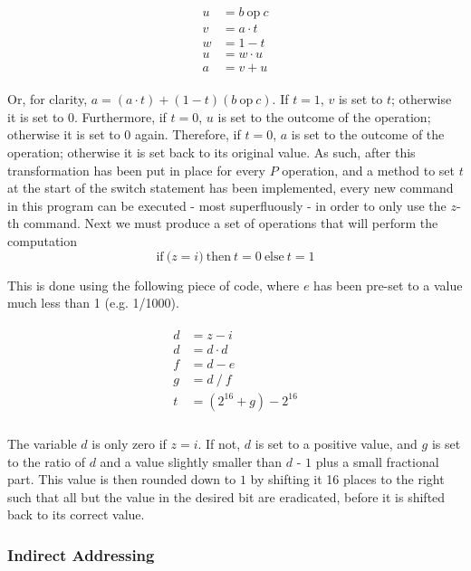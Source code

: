 \documentclass[Master.tex]{subfiles}
\begin{document}
\begin{gather*}
\begin{aligned}
u &= b\ \mathrm{op}\ c \\
v &= a \cdot t \\
w &= 1 - t \\
u &= w \cdot u \\
a &= v + u
\end{aligned}
\end{gather*}

Or, for clarity, $a = (a \cdot t) + (1 - t)(b\ \mathrm{op}\ c)$. If $t = 1$, $v$ is set to $t$; otherwise it is set to $0$. Furthermore, if $t = 0$, $u$ is set to the outcome of the operation; otherwise it is set to $0$ again. Therefore, if $t = 0$, $a$ is set to the outcome of the operation; otherwise it is set back to its original value. As such, after this transformation has been put in place for every $P$ operation, and a method to set $t$ at the start of the switch statement has been implemented, every new command in this program can be executed - most superfluously - in order to only use the $z$-th command. Next we must produce a set of operations that will perform the computation
\begin{equation*}
\mathrm{if\ (}z = i\mathrm{)\ then\ } t = 0 \mathrm{\ else\ } t = 1
\end{equation*}

This is done using the following piece of code, where $e$ has been pre-set to a value much less than 1 (e.g. 1/1000).

\begin{gather*}
\begin{aligned}
d &= z - i \\
d &= d \cdot d \\
f &= d - e \\
g &= d\ /\ f \\[1ex]
t &= (2^{16} + g) - 2^{16} \\
\end{aligned}
\end{gather*}

The variable $d$ is only zero if $z = i$. If not, $d$ is set to a positive value, and $g$ is set to the ratio of $d$ and a value slightly smaller than $d$ - $1$ plus a small fractional part. This value is then rounded down to $1$ by shifting it 16 places to the right such that all but the value in the desired bit are eradicated, before it is shifted back to its correct value.

\subsubsection{Indirect Addressing}
\end{document}
